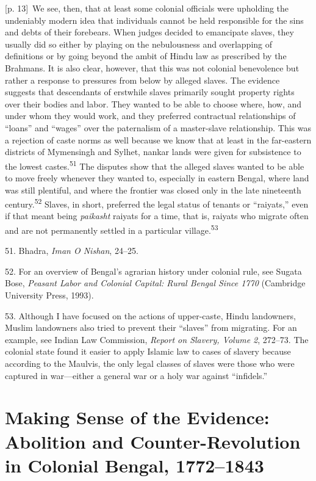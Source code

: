 \documentclass[10pt,a4paper]{article}
\begin{document}
{\scriptsize\color{gray} [p. 13]}\ We see, then, that at least some colonial officials were upholding the undeniably modern idea that individuals cannot be held responsible for the sins and debts of their forebears. When judges decided to emancipate slaves, they usually did so either by playing on the nebulousness and overlapping of definitions or by going beyond the ambit of Hindu law as prescribed by the Brahmans. It is also clear, however, that this was not colonial benevolence but rather a response to pressures from below by alleged slaves. The evidence suggests that descendants of erstwhile slaves primarily sought property rights over their bodies and labor. They wanted to be able to choose where, how, and under whom they would work, and they preferred contractual relationships of “loans” and “wages” over the paternalism of a master-slave relationship. This was a rejection of caste norms as well because we know that at least in the far-eastern districts of Mymensingh and Sylhet, nankar lands were given for subsistence to the lowest castes.\nobreak\textsuperscript{51} The disputes show that the alleged slaves wanted to be able to move freely whenever they wanted to, especially in eastern Bengal, where land was still plentiful, and where the frontier was closed only in the late nineteenth century.\nobreak\textsuperscript{52} Slaves, in short, preferred the legal status of tenants or “raiyats,” even if that meant being \textit{paikasht} raiyats for a time, that is, raiyats who migrate often and are not permanently settled in a particular village.\nobreak\textsuperscript{53}\par{\small 51. Bhadra, \textit{Iman O Nishan}, 24–25.\par}{\small 52. For an overview of Bengal’s agrarian history under colonial rule, see Sugata Bose, \textit{Peasant Labor and Colonial Capital: Rural Bengal Since 1770} (Cambridge University Press, 1993).\par}{\small 53. Although I have focused on the actions of upper-caste, Hindu landowners, Muslim landowners also tried to prevent their “slaves” from migrating. For an example, see Indian Law Commission, \textit{Report on Slavery, Volume 2}, 272–73. The colonial state found it easier to apply Islamic law to cases of slavery because according to the Maulvis, the only legal classes of slaves were those who were captured in war—either a general war or a holy war against “infidels.”\par}
\section*{Making Sense of the Evidence: Abolition and Counter-Revolution in Colonial Bengal, 1772–1843}
\end{document}
